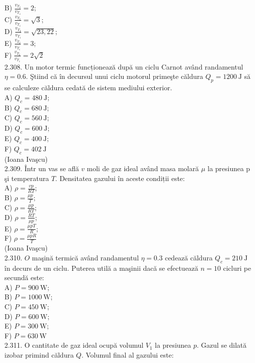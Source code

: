 \documentclass[10pt]{article}
\begin{document}
B) $\frac{v_{T_{2}}}{v_{T_{1}}}=2$;\\
C) $\frac{v_{T_{2}}}{v_{T_{1}}}=\sqrt{3}$;\\
D) $\frac{v_{T_{2}}}{v_{T_{1}}}=\sqrt{23,22}$;\\
E) $\frac{v_{T_{2}}}{v_{T_{1}}}=3$;\\
F) $\frac{v_{T_{2}}}{v_{T_{1}}}=2 \sqrt{2}$\\
2.308. Un motor termic funcționează după un ciclu Carnot având randamentul $\eta=0.6$. Ştiind că în decursul unui ciclu motorul primeşte căldura $Q_{p}=1200 \mathrm{~J}$ să se calculeze căldura cedată de sistem mediului exterior.\\
A) $Q_{c}=480 \mathrm{~J}$;\\
B) $Q_{c}=680 \mathrm{~J}$;\\
C) $Q_{c}=560 \mathrm{~J}$;\\
D) $Q_{c}=600 \mathrm{~J}$;\\
E) $Q_{c}=400 \mathrm{~J}$;\\
F) $Q_{c}=402 \mathrm{~J}$\\
(Ioana Ivaşcu)\\
2.309. Într un vas se află $v$ moli de gaz ideal având masa molară $\mu$ la presiunea p şi temperatura $T$. Densitatea gazului în aceste condiții este:\\
A) $\rho=\frac{v p}{R T}$;\\
B) $\rho=\frac{\mu p}{T}$;\\
C) $\rho=\frac{\mu p}{R T}$;\\
D) $\rho=\frac{R T}{\mu p}$;\\
E) $\rho=\frac{\mu p T}{R}$;\\
F) $\rho=\frac{\mu p R}{T}$\\
(Ioana Ivaşcu)\\
2.310. $O$ maşină termică având randamentul $\eta=0.3$ cedează căldura $Q_{c}=210 \mathrm{~J}$ în decurs de un ciclu. Puterea utilă a maşinii dacă se efectuează $n=10$ cicluri pe secundă este:\\
A) $P=900 \mathrm{~W}$;\\
B) $P=1000 \mathrm{~W}$;\\
C) $P=450 \mathrm{~W}$;\\
D) $P=600 \mathrm{~W}$;\\
E) $P=300 \mathrm{~W}$;\\
F) $P=630 \mathrm{~W}$\\
2.311. O cantitate de gaz ideal ocupă volumul $V_{1}$ la presiunea $p$. Gazul se dilată izobar primind căldura $Q$. Volumul final al gazului este:\\
\end{document}
